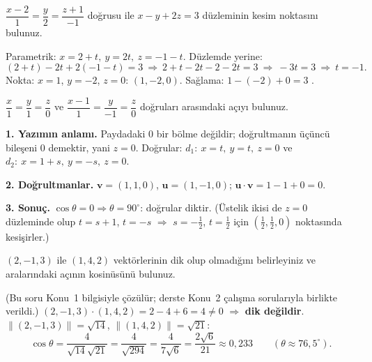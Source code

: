 \begin{soru}
$\dfrac{x-2}{1}=\dfrac{y}{2}=\dfrac{z+1}{-1}$ doğrusu ile $x-y+2z=3$ düzleminin kesim noktasını bulunuz.
\end{soru}
\begin{cevap}
Parametrik: $x=2+t,\ y=2t,\ z=-1-t$. Düzlemde yerine:
\[ (2+t)-2t+2(-1-t)=3\ \Rightarrow\ 2+t-2t-2-2t=3\ \Rightarrow\ -3t=3\ \Rightarrow\ t=-1 . \]
Nokta: $x=1$, $y=-2$, $z=0$: $\boxed{(1,-2,0)}$. Sağlama: $1-(-2)+0=3$ \checkmark.
\end{cevap}

\begin{soru}
$\dfrac{x}{1}=\dfrac{y}{1}=\dfrac{z}{0}$ ve $\dfrac{x-1}{1}=\dfrac{y}{-1}=\dfrac{z}{0}$ doğruları arasındaki açıyı bulunuz.
\end{soru}
\begin{cevap}
\textbf{1. Yazımın anlamı.} Paydadaki $0$ bir bölme değildir; doğrultmanın üçüncü bileşeni $0$ demektir, yani $z=0$. Doğrular: $d_1:\ x=t,\ y=t,\ z=0$ ve $d_2:\ x=1+s,\ y=-s,\ z=0$.

\textbf{2. Doğrultmanlar.} $\mathbf v=(1,1,0)$, $\mathbf u=(1,-1,0)$; $\mathbf u\cdot\mathbf v=1-1+0=0$.

\textbf{3. Sonuç.} $\cos\theta=0\Rightarrow\boxed{\theta=90^\circ}$: doğrular diktir. (Üstelik ikisi de $z=0$ düzleminde olup $t=s+1$, $t=-s$ $\Rightarrow$ $s=-\frac12$, $t=\frac12$ için $(\frac12,\frac12,0)$ noktasında kesişirler.)
\end{cevap}

\begin{soru}
$(2,-1,3)$ ile $(1,4,2)$ vektörlerinin dik olup olmadığını belirleyiniz ve aralarındaki açının kosinüsünü bulunuz.
\end{soru}
\begin{cevap}
(Bu soru Konu~1 bilgisiyle çözülür; derste Konu~2 çalışma sorularıyla birlikte verildi.)
$(2,-1,3)\cdot(1,4,2)=2-4+6=4\neq0$ $\Rightarrow$ \textbf{dik değildir}. $\|(2,-1,3)\|=\sqrt{14}$, $\|(1,4,2)\|=\sqrt{21}$:
\[ \cos\theta=\frac{4}{\sqrt{14}\sqrt{21}}=\frac{4}{\sqrt{294}}=\frac{4}{7\sqrt6}=\frac{2\sqrt6}{21}\approx0{,}233\qquad(\theta\approx76{,}5^\circ). \]
\end{cevap}

